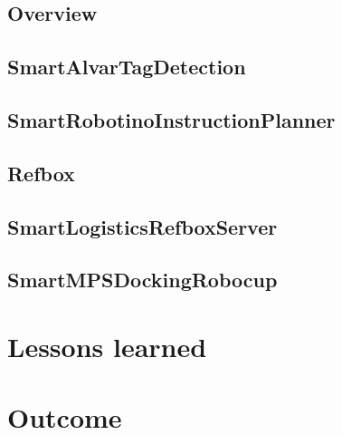 \documentclass[12pt]{article}
\begin{document}
\subsection{Overview}
	
	
\subsection{SmartAlvarTagDetection}
	
	
\subsection{SmartRobotinoInstructionPlanner}
	

\subsection{Refbox}
	

\subsection{SmartLogisticsRefboxServer}
	
	
\subsection{SmartMPSDockingRobocup}
	

\section{Lessons learned}
    

\section{Outcome}
    

\printbibliography
\end{document}
